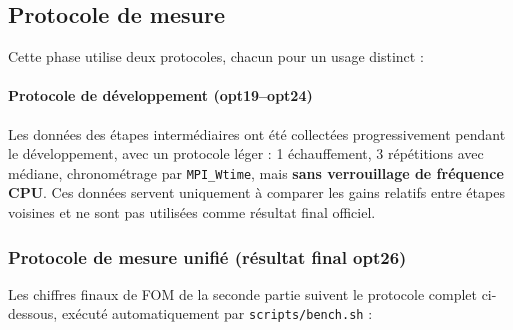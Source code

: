 \documentclass[a4paper,11pt,oneside]{report}
\begin{document}
\subsection{Protocole de mesure}\label{subsec:lbm_protocol}

Cette phase utilise deux protocoles, chacun pour un usage distinct :

\paragraph{Protocole de développement (opt19–opt24)}
Les données des étapes intermédiaires ont été collectées progressivement pendant le développement, avec un protocole léger : 1 échauffement, 3 répétitions avec médiane, chronométrage par \texttt{MPI\_Wtime}, mais \textbf{sans verrouillage de fréquence CPU}. Ces données servent uniquement à comparer les gains relatifs entre étapes voisines et ne sont pas utilisées comme résultat final officiel.

\subsubsection{Protocole de mesure unifié (résultat final opt26)}

Les chiffres finaux de FOM de la seconde partie suivent le protocole complet ci-dessous, exécuté automatiquement par \texttt{scripts/bench.sh} :
\end{document}
